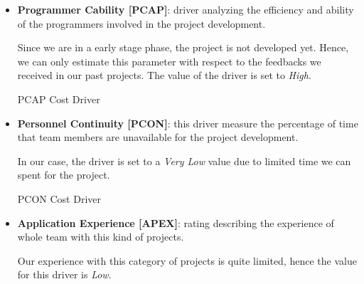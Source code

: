 \begin{itemize}
It's the first time we are facing with a project of this size and complexity. Therefore, the assigned value to this factor is \textit{Nominal}.

	\begin{costdriverstable}{ACAP Cost Driver}
		\hline
	\end{costdriverstable}

	\item \textbf{Programmer Cability [PCAP]}: driver analyzing the efficiency and ability of the programmers involved in the project development.

Since we are in a early stage phase, the project is not developed yet. Hence, we can only estimate this parameter with respect to the feedbacks we received in our past projects. The value of the driver is set to \textit{High}.

	\begin{costdriverstable}{PCAP Cost Driver}
		\hline
	\end{costdriverstable}

	\item \textbf{Personnel Continuity [PCON]}: this driver measure the percentage of time that team members are unavailable for the project development.

In our case, the driver is set to a \textit{Very Low} value due to limited time we can spent for the project.

	\begin{costdriverstable}{PCON Cost Driver}
		\hline	
	\end{costdriverstable}

	\item \textbf{Application Experience [APEX]}: rating describing the experience of whole team with this kind of projects.

Our experience with this category of projects is quite limited, hence the value for this driver is \textit{Low}.


\end{itemize}
